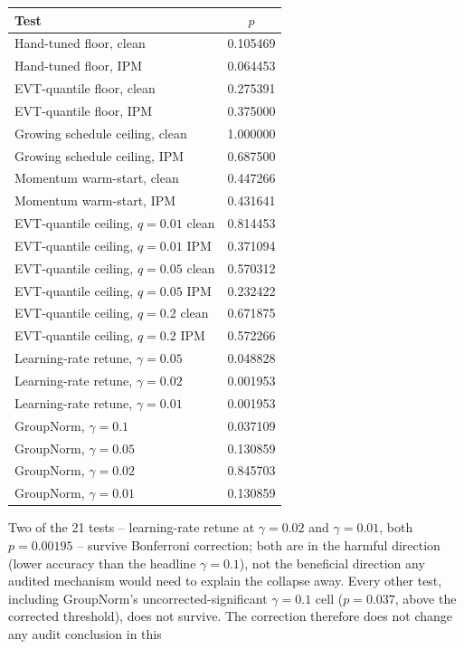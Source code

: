 \documentclass{article}
\begin{document}
\begin{center}
\small
\begin{tabular}{lc}
\toprule
Test & $p$ \\
\midrule
Hand-tuned floor, clean & 0.105469 \\
Hand-tuned floor, IPM & 0.064453 \\
EVT-quantile floor, clean & 0.275391 \\
EVT-quantile floor, IPM & 0.375000 \\
Growing schedule ceiling, clean & 1.000000 \\
Growing schedule ceiling, IPM & 0.687500 \\
Momentum warm-start, clean & 0.447266 \\
Momentum warm-start, IPM & 0.431641 \\
EVT-quantile ceiling, $q{=}0.01$ clean & 0.814453 \\
EVT-quantile ceiling, $q{=}0.01$ IPM & 0.371094 \\
EVT-quantile ceiling, $q{=}0.05$ clean & 0.570312 \\
EVT-quantile ceiling, $q{=}0.05$ IPM & 0.232422 \\
EVT-quantile ceiling, $q{=}0.2$ clean & 0.671875 \\
EVT-quantile ceiling, $q{=}0.2$ IPM & 0.572266 \\
Learning-rate retune, $\gamma{=}0.05$ & 0.048828 \\
Learning-rate retune, $\gamma{=}0.02$ & 0.001953 \\
Learning-rate retune, $\gamma{=}0.01$ & 0.001953 \\
GroupNorm, $\gamma{=}0.1$ & 0.037109 \\
GroupNorm, $\gamma{=}0.05$ & 0.130859 \\
GroupNorm, $\gamma{=}0.02$ & 0.845703 \\
GroupNorm, $\gamma{=}0.01$ & 0.130859 \\
\bottomrule
\end{tabular}
\end{center}
Two of the 21 tests -- learning-rate retune at $\gamma{=}0.02$ and
$\gamma{=}0.01$, both $p{=}0.00195$ -- survive Bonferroni correction; both are
in the harmful direction (lower accuracy than the headline $\gamma{=}0.1$), not
the beneficial direction any audited mechanism would need to explain the
collapse away. Every other test, including GroupNorm's uncorrected-significant
$\gamma{=}0.1$ cell ($p{=}0.037$, above the corrected threshold), does not
survive. The correction therefore does not change any audit conclusion in this
\end{document}
